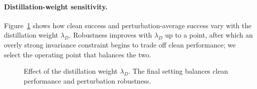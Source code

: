 \documentclass[letterpaper]{article} %
\begin{document}
\paragraph{Distillation-weight sensitivity.}
Figure~\ref{fig:lambda} shows how clean success and perturbation-average success vary with the distillation weight $\lambda_D$. Robustness improves with $\lambda_D$ up to a point, after which an overly strong invariance constraint begins to trade off clean performance; we select the operating point that balances the two.

\begin{figure}[h]
\centering
\caption{Effect of the distillation weight $\lambda_D$. The final setting balances clean performance and perturbation robustness.}
\label{fig:lambda}
\end{figure}

% 
\end{document}
